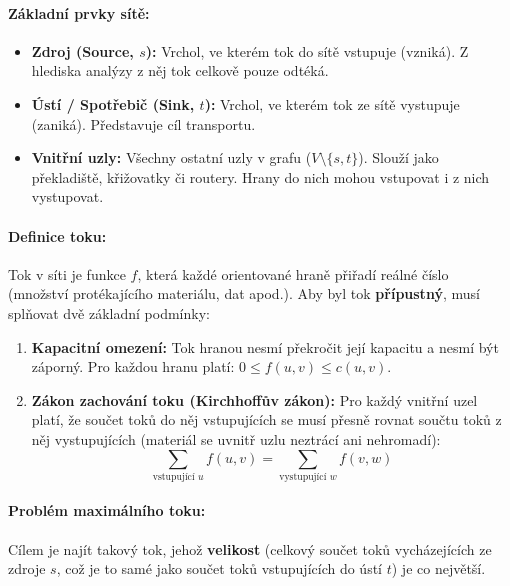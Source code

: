 \paragraph*{Základní prvky sítě:}
\begin{itemize}
    \item \textbf{Zdroj (Source, $s$):} Vrchol, ve kterém tok do sítě vstupuje (vzniká). Z hlediska analýzy z něj tok celkově pouze odtéká.
    \item \textbf{Ústí / Spotřebič (Sink, $t$):} Vrchol, ve kterém tok ze sítě vystupuje (zaniká). Představuje cíl transportu.
    \item \textbf{Vnitřní uzly:} Všechny ostatní uzly v grafu ($V \setminus \{s, t\}$). Slouží jako překladiště, křižovatky či routery. Hrany do nich mohou vstupovat i z nich vystupovat.
\end{itemize}

\paragraph*{Definice toku:}
Tok v síti je funkce $f$, která každé orientované hraně přiřadí reálné číslo (množství protékajícího materiálu, dat apod.). Aby byl tok \textbf{přípustný}, musí splňovat dvě základní podmínky:
\begin{enumerate}
    \item \textbf{Kapacitní omezení:} Tok hranou nesmí překročit její kapacitu a nesmí být záporný. Pro každou hranu platí: $0 \leq f(u, v) \leq c(u, v)$.
    \item \textbf{Zákon zachování toku (Kirchhoffův zákon):} Pro každý vnitřní uzel platí, že součet toků do něj vstupujících se musí přesně rovnat součtu toků z něj vystupujících (materiál se uvnitř uzlu neztrácí ani nehromadí):
    \[ \sum_{\text{vstupující } u} f(u, v) = \sum_{\text{vystupující } w} f(v, w) \]
\end{enumerate}

\paragraph*{Problém maximálního toku:}
Cílem je najít takový tok, jehož \textbf{velikost} (celkový součet toků vycházejících ze zdroje $s$, což je to samé jako součet toků vstupujících do ústí $t$) je co největší.

